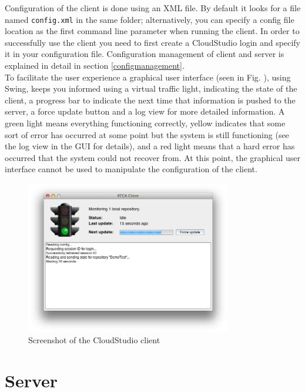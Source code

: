 Configuration of the client is done using an XML file. By default it looks for a file named \texttt{config.xml} in the same folder; alternatively, you can specify a config file location as the first command line parameter when running the client. In order to successfully use the client you need to first create a CloudStudio login and specify it in your configuration file. Configuration management of client and server is explained in detail in section \ref{configmanagement}. \\

To facilitate the user experience a graphical user interface (seen in Fig. \cite{fig:gui}), using Swing, keeps you informed using a virtual traffic light, indicating the state of the client, a progress bar to indicate the next time that information is pushed to the server, a force update button and a log view for more detailed information. A green light means everything functioning correctly, yellow indicates that some sort of error has occurred at some point but the system is still functioning (see the log view in the GUI for details), and a red light means that a hard error has occurred that the system could not recover from. At this point, the graphical user interface cannot be used to manipulate the configuration of the client. \\

\begin{figure}[h!]
  \centering
      \includegraphics[width=0.8\textwidth]{gui}
  \caption{Screenshot of the CloudStudio client}
  \label{fig:gui}
\end{figure}








\section{Server}

